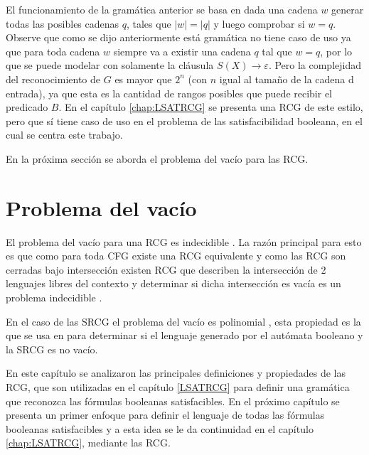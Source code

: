 \documentclass[12pt]{article}
\begin{document}
El funcionamiento de la gramática anterior se basa en dada una cadena $w$ generar todas las posibles cadenas
$q$, tales que $|w|=|q|$ y luego comprobar si $w = q$. Observe que como se dijo anteriormente está gramática
no tiene caso de uso ya que para toda cadena $w$ siempre va a existir una cadena $q$ tal que $w=q$, por lo
que se puede modelar con solamente la cláusula $S(X)\to \varepsilon$. Pero la complejidad del reconocimiento
de $G$ es mayor que $2^n$ (con $n$ igual al tamaño de la cadena d entrada), ya que esta es la cantidad de
rangos posibles que puede recibir el predicado $B$.  En el capítulo \ref{chap:LSATRCG} se presenta una RCG de
este estilo, pero que sí tiene caso de uso en el problema de las satisfacibilidad booleana, en el cual se centra este trabajo.

En la próxima sección se aborda el problema del vacío para las RCG.

\section{Problema del vacío}

El problema del vacío para una RCG es indecidible \cite{propertiesRCGBib}.
La razón principal para esto es que como para toda CFG existe una RCG equivalente y como las RCG son cerradas
bajo intersección existen RCG que describen la intersección de 2 lenguajes libres del contexto y determinar
si dicha intersección es vacía es un problema indecidible \cite{propertiesRCGBib}.

En el caso de las SRCG el problema del vacío es polinomial \cite{mainRCGBib}, esta propiedad es la que se usa en \cite{aSRCSAT}
para determinar si el lenguaje generado por el autómata booleano y la SRCG es no vacío.

En este capítulo se analizaron las principales definiciones y propiedades de las RCG, que son utilizadas en el capítulo \ref{LSATRCG}
para definir una gramática que reconozca las fórmulas booleanas satisfacibles. En el próximo capítulo se presenta
un primer enfoque para definir el lenguaje de todas las fórmulas booleanas satisfacibles y a esta idea se le da
continuidad en el capítulo \ref{chap:LSATRCG}, mediante las RCG.
\end{document}
